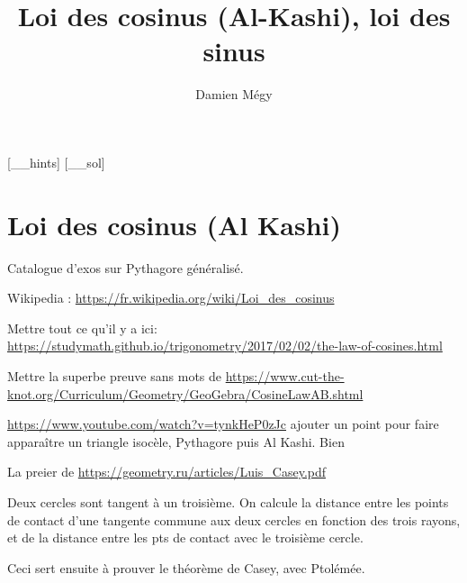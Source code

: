 





[_\jobname_hints]
[_\jobname_sol]


\title{Loi des cosinus (Al-Kashi), loi des sinus}
\author{Damien Mégy}
\maketitle


\avertissement 



\section{Loi des cosinus (Al Kashi)}

Catalogue d'exos sur Pythagore généralisé.

Wikipedia : \url{https://fr.wikipedia.org/wiki/Loi_des_cosinus}

Mettre tout ce qu'il y a ici: \url{https://studymath.github.io/trigonometry/2017/02/02/the-law-of-cosines.html}

Mettre la superbe preuve sans mots de \url{https://www.cut-the-knot.org/Curriculum/Geometry/GeoGebra/CosineLawAB.shtml}



\begin{exo}
\url{https://www.youtube.com/watch?v=tynkHeP0zJc} ajouter un point pour faire apparaître un triangle isocèle, Pythagore puis Al Kashi. Bien
\end{exo}

\begin{exo}
La preier de \url{https://geometry.ru/articles/Luis_Casey.pdf}

Deux cercles sont tangent à un troisième. On calcule la distance entre les points de contact d'une tangente commune aux deux cercles en fonction  des trois rayons, et de la distance entre les pts de contact avec le troisième cercle.

Ceci sert ensuite à prouver le théorème de Casey, avec Ptolémée.
\end{exo}


